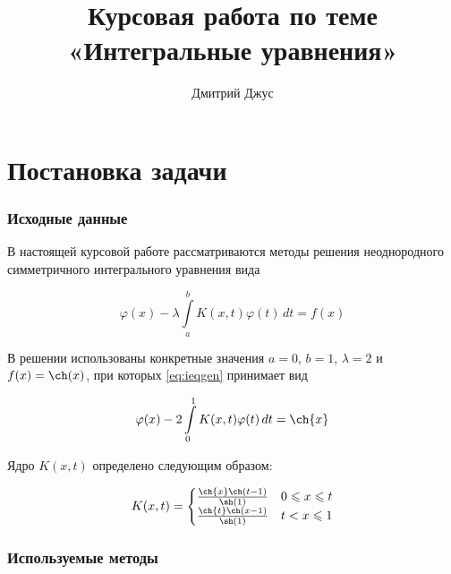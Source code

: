 \documentclass{article}
\numberwithin{equation}{section}
\renewcommand{\phi}{\varphi}
\renewcommand{\leq}{\leqslant}
\newcommand{\intl}{\int\limits}
\begin{document}
\author{Дмитрий Джус}
\title{Курсовая работа по теме \\
  \Huge{«Интегральные уравнения»}}
\pretitle{\begin{center}\LARGE}
\posttitle{\par\end{center}\vskip 3pc}
\date{}
\maketitle
\thispagestyle{empty}

\clearpage
\tableofcontents

\clearpage
\part{Постановка задачи}

\section{Исходные данные}
\label{sec:problem}
В настоящей курсовой работе рассматриваются методы решения
неоднородного симметричного интегрального уравнения вида

\begin{equation}
  \label{eq:ieqgen}
  \phi(x) - \lambda \intl_a^b {K(x, t) \phi(t)\,dt} = f(x)
\end{equation}

В решении использованы конкретные значения $a=0$, $b=1$, $\lambda = 2$
и $f(x) = \ch(x)$, при которых \eqref{eq:ieqgen} принимает вид

\begin{equation}
  \label{eq:ieq}
  \phi(x) - 2 \intl_0^1 {K(x, t) \phi(t)\,dt} = \ch{x}
\end{equation}

Ядро $K(x,t)$ определено следующим образом:

\begin{equation}
  \label{eq:kernel}
  K(x, t) = 
  \begin{cases}
    \frac{\ch{x} \ch(t-1)}{\sh(1)} & 0 \leq x \leq t\\
    \frac{\ch{t} \ch(x-1)}{\sh(1)} & t < x \leq 1
  \end{cases}
\end{equation}

\section{Используемые методы}
\end{document}
